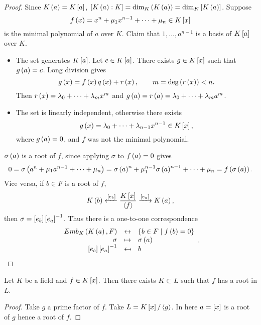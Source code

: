 \begin{proof}
Since $ K\rb{a} = K\sb{a} $, $ \sb{K\rb{a} : K} = \dim_K\rb{K\rb{a}} = \dim_K\sb{K\rb{a}} $. Suppose
$$ f\rb{x} = x^n + \mu_1x^{n - 1} + \dots + \mu_n \in K\sb{x} $$
is the minimal polynomial of $ a $ over $ K $. Claim that $ 1, \dots, a^{n - 1} $ is a basis of $ K\sb{a} $ over $ K $.
\begin{itemize}
\item The set generates $ K\sb{a} $. Let $ c \in K\sb{a} $. There exists $ g \in K\sb{x} $ such that $ g\rb{a} = c $. Long division gives
$$ g\rb{x} = f\rb{x}q\rb{x} + r\rb{x}, \qquad m = \deg\rb{r\rb{x}} < n. $$
Then $ r\rb{x} = \lambda_0 + \dots + \lambda_mx^m $ and $ g\rb{a} = r\rb{a} = \lambda_0 + \dots + \lambda_ma^m $.
\item The set is linearly independent, otherwise there exists
$$ g\rb{x} = \lambda_0 + \dots + \lambda_{n - 1}x^{n- 1} \in K\sb{x}, $$
where $ g\rb{a} = 0 $, and $ f $ was not the minimal polynomial.
\end{itemize}
$ \sigma\rb{a} $ is a root of $ f $, since applying $ \sigma $ to $ f\rb{a} = 0 $ gives
$$ 0 = \sigma\rb{a^n + \mu_1a^{n - 1} + \dots + \mu_n} = \sigma\rb{a}^n + \mu_1^{n - 1}\sigma\rb{a}^{n - 1} + \dots + \mu_n = f\rb{\sigma\rb{a}}. $$
Vice versa, if $ b \in F $ is a root of $ f $,
$$ K\rb{b} \xleftarrow{\sb{e_b}} \dfrac{K\sb{x}}{\ab{f}} \xrightarrow{\sb{e_a}} K\rb{a}, $$
then $ \sigma = \sb{e_b}\sb{e_a}^{-1} $. Thus there is a one-to-one correspondence
$$
\begin{array}{rcl}
Emb_K\rb{K\rb{a}, F} & \leftrightarrow & \cb{b \in F \mid f\rb{b} = 0} \\
\sigma & \mapsto & \sigma\rb{a} \\
\sb{e_b}\sb{e_a}^{-1} & \mapsfrom & b
\end{array}.
$$
\end{proof}

\begin{corollary}
Let $ K $ be a field and $ f \in K\sb{x} $. Then there exists $ K \subset L $ such that $ f $ has a root in $ L $.
\end{corollary}

\begin{proof}
Take $ g $ a prime factor of $ f $. Take $ L = K\sb{x} / \ab{g} $. In here $ a = \sb{x} $ is a root of $ g $ hence a root of $ f $.
\end{proof}

